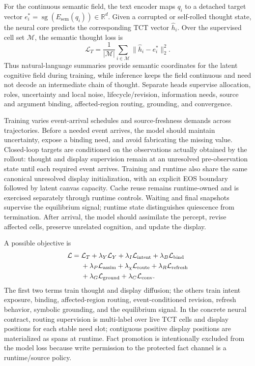 For the continuous semantic field, the text encoder maps $q_i$ to a detached target vector $e_i^*=\operatorname{sg}(E_{\mathrm{sem}}(q_i))\in\mathbb{R}^d$. Given a corrupted or self-rolled thought state, the neural core predicts the corresponding TCT vector $\hat h_i$. Over the supervised cell set $\mathcal{M}$, the semantic thought loss is
\begin{equation}
  \mathcal{L}_{T}=\frac{1}{|\mathcal{M}|}\sum_{i\in\mathcal{M}}\lVert \hat h_i-e_i^*\rVert_2^2.
  \label{eq:thought-semantic-loss}
\end{equation}
Thus natural-language summaries provide semantic coordinates for the latent cognitive field during training, while inference keeps the field continuous and need not decode an intermediate chain of thought. Separate heads supervise allocation, roles, uncertainty and local noise, lifecycle/revision, information needs, source and argument binding, affected-region routing, grounding, and convergence.

Training varies event-arrival schedules and source-freshness demands across trajectories. Before a needed event arrives, the model should maintain uncertainty, expose a binding need, and avoid fabricating the missing value. Closed-loop targets are conditioned on the observations actually obtained by the rollout: thought and display supervision remain at an unresolved pre-observation state until each required event arrives. Training and runtime also share the same canonical unresolved display initialization, with an explicit EOS boundary followed by latent canvas capacity. Cache reuse remains runtime-owned and is exercised separately through runtime controls. Waiting and final snapshots supervise the equilibrium signal; runtime state distinguishes quiescence from termination. After arrival, the model should assimilate the percept, revise affected cells, preserve unrelated cognition, and update the display.

A possible objective is
\begin{align}
  \mathcal{L} ={}& \mathcal{L}_{T}
  + \lambda_Y\mathcal{L}_{Y}
  + \lambda_I\mathcal{L}_{\mathrm{intent}}
  + \lambda_B\mathcal{L}_{\mathrm{bind}} \notag\\
  &+ \lambda_P\mathcal{L}_{\mathrm{assim}}
  + \lambda_{\chi}\mathcal{L}_{\mathrm{route}}
  + \lambda_R\mathcal{L}_{\mathrm{refresh}} \notag\\
  &+ \lambda_G\mathcal{L}_{\mathrm{ground}}
  + \lambda_C\mathcal{L}_{\mathrm{conv}}.
  \label{eq:training-objective}
\end{align}
The first two terms train thought and display diffusion; the others train intent exposure, binding, affected-region routing, event-conditioned revision, refresh behavior, symbolic grounding, and the equilibrium signal. In the concrete neural contract, routing supervision is multi-label over live TCT cells and display positions for each stable need slot; contiguous positive display positions are materialized as spans at runtime. Fact promotion is intentionally excluded from the model loss because write permission to the protected fact channel is a runtime/source policy.

